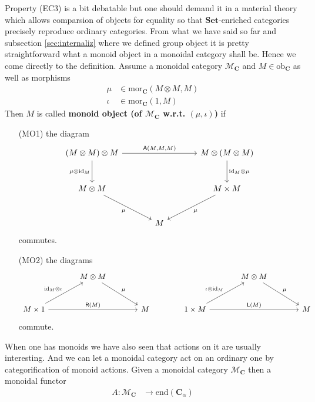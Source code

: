 Property (EC3) is a bit debatable but one should demand it in a material theory which allows comparsion of objects for equality so that $\mathbf{Set}$-enriched categories precisely reproduce ordinary categories. From what we have said so far and subsection \ref{sec:internaliz} where we defined group object it is pretty straightforward what a monoid object in a monoidal category shall be. Hence we come directly to the definition. Assume a monoidal category $\mathcal{M}_{\mathbf{C}}$ and $M \in \mathrm{ob}_{\mathbf{C}}$ as well as morphisms
\begin{align*}
  \mu
  &\in
  \mathrm{mor}_{\mathbf{C}}
  \left(
    M
    \otimes
    M,
    M
  \right)
  \\
  \iota
  &\in
  \mathrm{mor}_{\mathbf{C}}
  \left(
    1,
    M
  \right)
\end{align*}
Then $M$ is called \textbf{monoid object (of $\mathcal{M}_{\mathbf{C}}$ w.r.t. $(\mu,\iota)$)} if
\begin{enumerate}
\item[(MO1)]
the diagram
\[
\begin{tikzcd}[sep=large]
  (M \otimes M)
  \otimes
  M
  \arrow{rr}{\mathsf{A}(M,M,M)}
  \arrow[swap]{d}{\mu \otimes \mathrm{id}_{M}}
  &
  &
  M
  \otimes
  (M \otimes M)
  \arrow{d}{\mathrm{id}_{M} \otimes \mu}
  \\
  M
  \otimes
  M
  \arrow[swap]{dr}{\mu}
  &
  &
  M
  \times
  \arrow{dl}{\mu}
  M
  \\
  &
  M
  &
\end{tikzcd}
\]
commutes.
\item[(MO2)]
the diagrams
\[
\begin{tikzcd}[sep=large]
  &
  M
  \otimes
  M
  \arrow{dr}{\mu}
  &
  &
  &
  M
  \otimes
  M
  \arrow{dr}{\mu}
  &
  \\
  M
  \times
  1
  \arrow{ur}{\mathrm{id}_{M} \otimes \iota}
  \arrow{rr}{\mathsf{R}(M)}
  &
  &
  M
  &
  1
  \times
  M
  \arrow{ur}{\iota \otimes \mathrm{id}_{M}}
  \arrow{rr}{\mathsf{L}(M)}
  &
  &
  M
\end{tikzcd}
\]
commute.
\end{enumerate}
When one has monoids we have also seen that actions on it are usually interesting. And we can let a monoidal category act on an ordinary one by categorification of monoid actions. Given a monoidal category $\mathcal{M}_{\mathbf{C}}$ then a monoidal functor
\begin{align*}
  A
  \colon
  \mathcal{M}_{\mathbf{C}}
  &\rightarrow
  \mathrm{end}(\mathbf{C}_{\alpha})
\end{align*}
